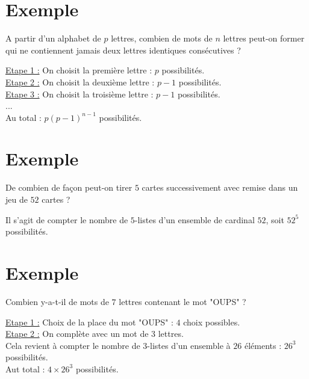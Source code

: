 \documentclass[../main.tex]{subfiles}
\begin{document}
\section{Exemple}
\begin{tcolorbox}[title=Exemple 31.20, title filled=false, colframe=darkgreen, colback=darkgreen!10!white]
    A partir d'un alphabet de $p$ lettres, combien de mots de $n$ lettres peut-on former qui ne contiennent jamais deux lettres identiques consécutives ?
\end{tcolorbox}

\noindent\underline{Etape 1 :} On choisit la première lettre : $p$ possibilités. \\
\noindent\underline{Etape 2 :} On choisit la deuxième lettre : $p-1$ possibilités. \\
\noindent\underline{Etape 3 :} On choisit la troisième lettre : $p-1$ possibilités. \\
...\\
Au total : $p(p-1)^{n-1}$ possibilités. 

\section{Exemple}
\begin{tcolorbox}[title=Exemple 31.27, title filled=false, colframe=darkgreen, colback=darkgreen!10!white]
    De combien de façon peut-on tirer $5$ cartes successivement avec remise dans un jeu de $52$ cartes ?
\end{tcolorbox}

\noindent Il s'agit de compter le nombre de $5$-listes d'un ensemble de cardinal $52$, soit $52^5$ possibilités. 

\section{Exemple}
\begin{tcolorbox}[title=Exemple 31.28, title filled=false, colframe=darkgreen, colback=darkgreen!10!white]
    Combien y-a-t-il de mots de $7$ lettres contenant le mot "OUPS" ?
\end{tcolorbox}

\noindent\underline{Etape 1 :} Choix de la place du mot "OUPS" : $4$ choix possibles. \\
\noindent\underline{Etape 2 :} On complète avec un mot de $3$ lettres. \\ Cela revient à compter le nombre de $3$-listes d'un ensemble à $26$ éléments : $26^3$ possibilités. \\
Aut total : $4\times 26^3$ possibilités.
\end{document}
